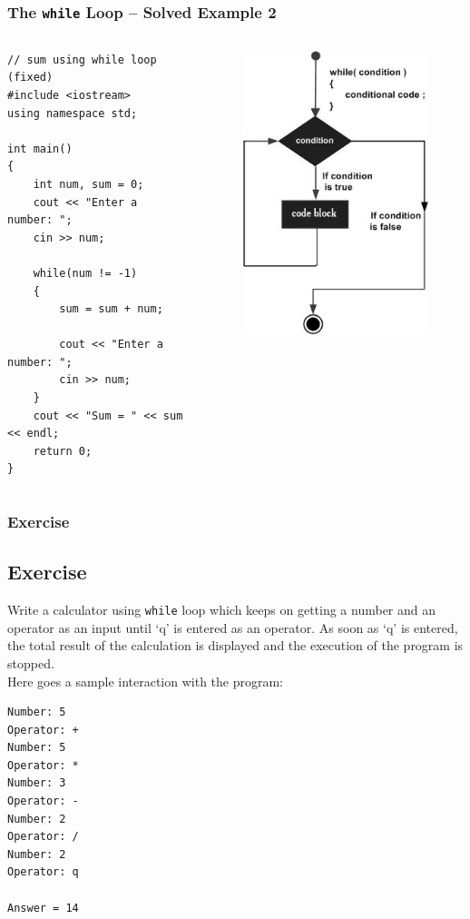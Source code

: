 \documentclass{beamer}
\begin{document}
\begin{frame} [fragile]
    \frametitle{The \texttt{while} Loop -- Solved Example 2}
    \begin{columns}
        \lstset{style=mystyle}
\begin{lstlisting}
// sum using while loop (fixed)
#include <iostream>
using namespace std;

int main()
{
    int num, sum = 0;
    cout << "Enter a number: ";
    cin >> num;

    while(num != -1)
    {
        sum = sum + num;

        cout << "Enter a number: ";
        cin >> num;
    }
    cout << "Sum = " << sum << endl;
    return 0;
}
\end{lstlisting}
            \begin{figure}
                \centering
                \includegraphics[scale=0.4]{while}
            \end{figure}
    \end{columns}
\end{frame}

\begin{frame} [fragile]
    \frametitle{Exercise}
    \subsection{Exercise} %
    \label{subsec:while_exercise}
    Write a calculator using \texttt{while} loop which keeps on getting a number and an operator as an input until `q' is entered as an operator. As soon as `q' is entered, the total result of the calculation is displayed and the execution of the program is stopped. \\ [0.2 in]
    Here goes a sample interaction with the program: \\
    \lstset{style=mystyle}
\begin{lstlisting}
Number: 5
Operator: +
Number: 5
Operator: *
Number: 3
Operator: -
Number: 2
Operator: /
Number: 2
Operator: q

Answer = 14
\end{lstlisting}
\end{frame}
\end{document}
